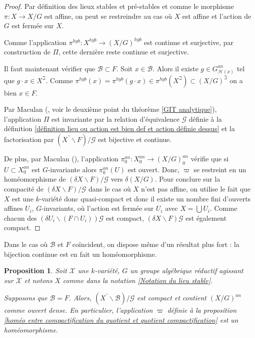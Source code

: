 \documentclass[11pt]{article}
\newtheorem{prop}[thm]{Proposition}
\begin{document}
\begin{proof}
Par définition des lieux stables et pré-stables et comme le morphisme $\pi : X \rightarrow X/G$ est affine, on peut se restreindre au cas où $X$ est affine et l'action de $G$ est fermée sur $X$.

Comme l'application $\pi^{hyb} : X^{hyb} \rightarrow (X/G)^{hyb}$ est continue et surjective, par construction de $\Pi$, cette dernière reste continue et surjective.

Il faut maintenant vérifier que $\mathcal{B} \subset F$. Soit $x\in \mathcal{B}$. Alors il existe $g\in G^{an}_{\mathcal{H}(x)}$ tel que $g\cdot x \in X^\beth$. Comme $\pi^{hyb}(x) = \pi^{hyb}(g\cdot x) \in \pi^{hyb}(X^\beth) \subset (X/G)^\beth$ on a bien $x \in F$.

Par Maculan (\cite{MaculanGIT}, voir le deuxième point du théorème \ref{GIT analytique}), l'application $\Pi$ est invariante par la relation d'équivalence $\mathcal{G}$ définie à la définition \ref{définition lieu ou action est bien def et action définie dessus} et la factorisation par $(X^\urcorner\backslash F)/\mathcal{G}$ est bijective et continue. 

De plus, par Maculan (\cite{MaculanGIT}), l'application $\pi^{an}_0 : X^{an}_0 \rightarrow (X/G)^{an}_0$ vérifie que si $U \subset X^{an}_0$ est $G$-invariante alors $\pi^{an}_0(U)$ est ouvert. Donc, $\varpi$ se restreint en un homéomorphisme de $(\delta X\backslash F)/\mathcal{G}$ vers $\delta (X/G)$. Pour conclure sur la compacité de $(\delta X\backslash F)/\mathcal{G}$ dans le cas où $X$ n'est pas affine, on utilise le fait que $X$ est une $k$-variété donc quasi-compact et donc il existe un nombre fini d'ouverts affines $U_i$, $G$-invariants, où l'action est fermée sur $U_i$ avec $X = \bigcup U_i$. Comme chacun des $(\delta U_i \backslash (F\cap U_i))\mathcal{G}$ est compact, $(\delta X\backslash F)\mathcal{G}$ est également compact. 
\end{proof}

Dans le cas où $\mathcal{B}$ et $F$ coïncident, on dispose même d'un résultat plus fort : la bijection continue est en fait un homéomorphisme.

\begin{prop}\label{lieu où l'action est bien définie est compact}
Soit $\mathcal{X}$ une $k$-variété, $G$ un groupe algébrique réductif agissant sur $\mathcal{X}$ et notons $X$ comme dans la notation \ref{Notation du lieu stable}. 

Supposons que $\mathcal{B} = F$. Alors, $(X^\urcorner \backslash \mathcal{B})/\mathcal{G}$ est compact et contient $(X/G)^{an}$ comme ouvert dense. En particulier, l'application $\varpi$ définie à la proposition \ref{homéo entre compactification du quotient et quotient compactification} est un homéomorphisme.
\end{prop}
\end{document}
